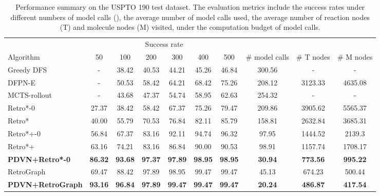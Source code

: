\documentclass[nohyperref]{article}
\theoremstyle{plain}
\theoremstyle{definition}
\theoremstyle{remark}
\begin{document}
\begin{table*}[t]
    \caption{Performance summary on the USPTO 190 test dataset. The evaluation metrics include the success rates under different numbers of model calls (), the average number of model calls used, the average number of reaction nodes (T) and molecule nodes (M) visited, under the computation budget of  model calls.}
    \label{tab:main_results}
    \centering
    \resizebox{\textwidth}{!} {\begin{tabular}{l cccccc ccc}
        \toprule
         & \multicolumn{6}{c}{Success rate } & \\
        \cmidrule(lr){2-7} 
        Algorithm & 50  & 100 & 200 & 300 & 400 & 500 & \# model calls  & \# T nodes  & \# M nodes  \\
        \midrule
        Greedy DFS & - & 38.42 & 40.53 & 44.21 & 45.26 & 46.84 & 300.56 & - & - \\
        DFPN-E & - & 50.53 & 58.42 & 64.21 & 68.42 & 75.26 & 208.12 & 3123.33 & 4635.08 \\
        MCTS-rollout & - & 43.68 & 47.37 & 54.74 & 58.95 & 62.63 & 254.32 & - & - \\
        \midrule
        Retro*-0 & 27.37 & 38.42 & 58.42 & 67.37 & 75.26 & 79.47 & 209.86 & 3905.62 & 5565.37 \\
        Retro* & 40.00 & 55.79 & 70.53 & 76.84 & 82.11 & 85.79 & 158.81 & 2632.84 & 3685.31 \\
        Retro*+-0 & 56.84 & 67.37 & 83.16 & 92.11 & 94.74 & 96.32 & 97.95 & 1444.52 & 2139.3 \\
        Retro*+ & 63.16 & 74.21 & 83.16 & 86.84 & 90.00 & 90.53 & 98.91 & 1157.74 & 1708.17 \\
\textbf{PDVN+Retro*-0} & \textbf{86.32} & \textbf{93.68} & \textbf{97.37} & \textbf{97.89} & \textbf{98.95} & \textbf{98.95} & \textbf{30.94} & \textbf{773.56} &  \textbf{995.22} \\
        \midrule
        RetroGraph & 69.47 & 88.42 & 97.89 & 98.95 & 99.47 & 99.47 & 45.13 & 674.23 & 500.44 \\
\textbf{PDVN+RetroGraph} & \textbf{93.16} & \textbf{96.84} & \textbf{97.89} & \textbf{99.47} & \textbf{99.47} & \textbf{99.47} & \textbf{20.24} & \textbf{486.87} & \textbf{417.54} \\
        
\bottomrule
    \end{tabular}}
\end{table*}
\end{document}
